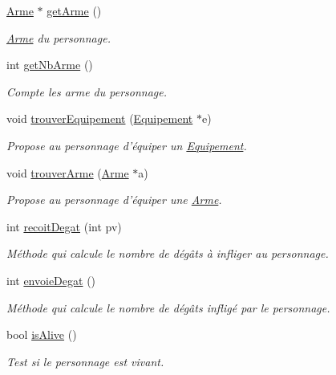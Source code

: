 \begin{DoxyCompactItemize}
\hyperlink{class_arme}{Arme} $\ast$ \hyperlink{class_personnage_ac399a7dff2285dabcd75efb85a72e0fd}{get\-Arme} ()
\begin{DoxyCompactList}\small\item\em \hyperlink{class_arme}{Arme} du personnage. \end{DoxyCompactList}\item 
int \hyperlink{class_personnage_a16c55bf218d254e100dbde44bcad8aeb}{get\-Nb\-Arme} ()
\begin{DoxyCompactList}\small\item\em Compte les arme du personnage. \end{DoxyCompactList}\item 
void \hyperlink{class_personnage_a039ce12768debca443459af1eb3ca176}{trouver\-Equipement} (\hyperlink{class_equipement}{Equipement} $\ast$e)
\begin{DoxyCompactList}\small\item\em Propose au personnage d'équiper un \hyperlink{class_equipement}{Equipement}. \end{DoxyCompactList}\item 
void \hyperlink{class_personnage_a020576cc14d815a1f4ebb9afe677e4c7}{trouver\-Arme} (\hyperlink{class_arme}{Arme} $\ast$a)
\begin{DoxyCompactList}\small\item\em Propose au personnage d'équiper une \hyperlink{class_arme}{Arme}. \end{DoxyCompactList}\item 
int \hyperlink{class_personnage_aedf77fe983813e2cdfcf2581379432a1}{recoit\-Degat} (int pv)
\begin{DoxyCompactList}\small\item\em Méthode qui calcule le nombre de dégâts à infliger au personnage. \end{DoxyCompactList}\item 
int \hyperlink{class_personnage_acbaafe5c61c924b5a4b3698d05fc365b}{envoie\-Degat} ()
\begin{DoxyCompactList}\small\item\em Méthode qui calcule le nombre de dégâts infligé par le personnage. \end{DoxyCompactList}\item 
bool \hyperlink{class_personnage_a0dfc3d986a2c53e5f5f3e0f3138ade5b}{is\-Alive} ()
\begin{DoxyCompactList}\small\item\em Test si le personnage est vivant. \end{DoxyCompactList}\end{DoxyCompactItemize}
